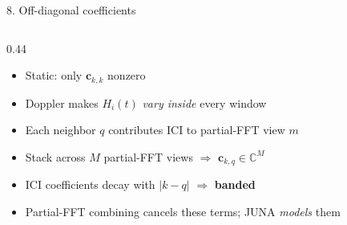\documentclass[aspectratio=169,10pt]{beamer}
\newcommand{\vc}{\bm{c}}
\newcommand{\Cx}{\mathbb{C}}
\begin{document}
\begin{frame}{8. Off-diagonal coefficients}

  \begin{columns}[T,onlytextwidth]
    \begin{column}{0.44\textwidth}
      \begin{itemize}\setlength{\itemsep}{0.22em}
        \item Static: only $\vc_{k,k}$ nonzero
        \item Doppler makes $H_i(t)$ \emph{vary inside} every window
        \item Each neighbor $q$ contributes ICI to partial-FFT view $m$
        \item Stack across $M$ partial-FFT views $\Rightarrow$ $\vc_{k,q}\in\Cx^{M}$
        \item ICI coefficients decay with $|k-q|$ $\Rightarrow$ \textbf{banded}
        \item Partial-FFT combining cancels these terms; JUNA \emph{models} them
      \end{itemize}
    \end{column}


\end{columns}
\end{frame}
\end{document}
